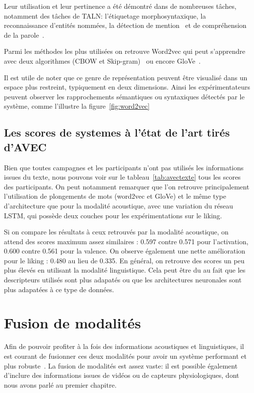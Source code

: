 Leur utilisation et leur pertinence a été démontré dans de nombreuses tâches, notamment des tâches de TALN: l’étiquetage morphosyntaxique, la reconnaissance d’entités nommées, la détection de mention~\cite{Turian2010,Bansal2014} et de compréhension de la parole~\cite{Mesnil2013,Yao2014,Liu2016}.

Parmi les méthodes les plus utilisées on retrouve Word2vec qui peut s'apprendre avec deux algorithmes (CBOW et Skip-gram)~\cite{word2vec} ou encore GloVe~\cite{Pennington2014}.

Il est utile de noter que ce genre de représentation peuvent être visualisé dans un espace plus restreint, typiquement en deux dimensions. Ainsi les expérimentateurs peuvent observer les rapprochements sémantiques ou syntaxiques détectés par le système, comme l'illustre la figure~\ref{fig:word2vec}


\subsection{Les scores de systemes à l'état de l'art tirés d'AVEC}


Bien que toutes campagnes et les participants n'ont pas utilisés les informations issues du texte, nous pouvons voir sur le tableau~\ref{tab:avectexte} tous les scores des participants. On peut notamment remarquer que l'on retrouve principalement l'utilisation de plongements de mots (word2vec et GloVe) et le même type d'architecture que pour la modalité acoustique, avec une variation du réseau LSTM, qui possède deux couches pour les expérimentations sur le liking.

Si on compare les résultats à ceux retrouvés par la modalité acoustique, on attend des scores maximum assez similaires : 0.597 contre 0.571 pour l'activation, 0.600 contre 0.561 pour la valence. On observe également une nette amélioration pour le liking : 0.480 au lieu de 0.335. En général, on retrouve des scores un peu plus élevés en utilisant la modalité linguistique. Cela peut être du au fait que les descripteurs utilisés sont plus adapatés ou que les architectures neuronales sont plus adapatées à ce type de données.

\section{Fusion de modalités}
Afin de pouvoir profiter à la fois des informations acoustiques et linguistiques, il est courant de fusionner ces deux modalités pour avoir un système performant et plus robuste~\cite{Wollmer2013,Alam2014,Atrey2010,Liu2018}. La fusion de modalités est assez vaste: il est possible également d'inclure des informations issues de vidéos ou de capteurs physiologiques, dont nous avons parlé au premier chapitre.

